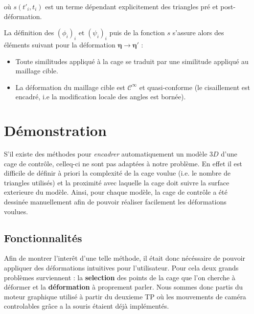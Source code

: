 \documentclass[10pt,a4paper]{article}
\begin{document}
où $s \left(t'_i, t_i \right)$ est un terme dépendant explicitement des triangles pré et post-déformation.

La définition des $\left( \phi_i \right)_i$ et $\left( \psi_i \right)_i$ puis de la fonction $s$ s'assure alors des éléments suivant pour la déformation $\boldsymbol\eta \rightarrow \boldsymbol\eta'$ :
\begin{itemize}
\item Toute similitudes appliqué à la cage se traduit par une similitude appliqué au maillage cible.
\item La déformation du maillage cible est $\mathcal{C}^\infty$ et quasi-conforme (le cisaillement est encadré, i.e la modification locale des angles est bornée).
\end{itemize}

\section{Démonstration}
S'il existe des méthodes pour \textit{encadrer} automatiquement un modèle $3D$ d'une cage de contrôle, celleq-ci ne sont pas adaptées à notre problème. En effet il est difficile de définir à  priori la complexité de la cage voulue (i.e. le nombre de triangles utilisés) et la proximité avec laquelle la cage doit suivre la surface exterieure du modèle. Ainsi, pour chaque modèle, la cage de contrôle a été dessinée manuellement afin de pouvoir réaliser facilement les déformations voulues.
 
\subsection{Fonctionnalités}
Afin de montrer l'interêt d'une telle méthode, il était donc nécéssaire de pouvoir appliquer des déformations intuitives pour l'utilisateur. Pour cela deux grands problèmes surviennent : la \textbf{selection} des points de la cage que l'on cherche à déformer et la \textbf{déformation} à proprement parler. Nous sommes donc partis du moteur graphique utilisé à partir du deuxieme TP où les mouvements de caméra controlables grâce a la souris étaient déjà implémentés.
\end{document}
